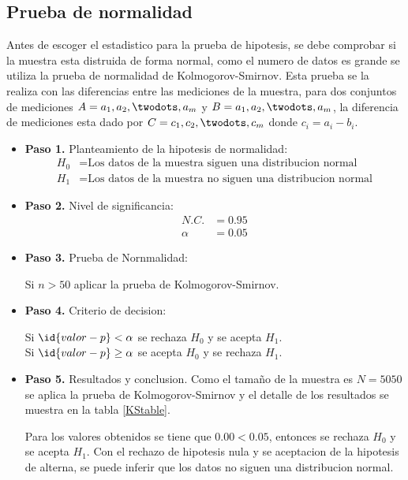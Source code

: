 \subsection{Prueba de normalidad}
Antes de escoger el estadistico para la prueba de hipotesis, se debe comprobar si la muestra esta distruida de forma normal, como el numero de datos es grande se utiliza la prueba de normalidad de Kolmogorov-Smirnov. Esta prueba se la realiza con las diferencias entre las mediciones de la muestra, para dos conjuntos de mediciones $A={a_1,a_2,\twodots,a_m}$ y $B={a_1,a_2,\twodots,a_m}$, la diferencia de mediciones esta dado por $C={c_1,c_2,\twodots,c_m}$ donde $c_i = a_i - b_i$.
\begin{itemize}
  \item[] \textbf{Paso 1.} Planteamiento de la hipotesis de normalidad:
  \begin{equation*}
  \begin{split}
  H_0 & = \text{Los datos de la muestra siguen una distribucion normal}\\
  H_1 & = \text{Los datos de la muestra no siguen una distribucion normal}
  \end{split}
  \end{equation*}
  \item[] \textbf{Paso 2.} Nivel de significancia:
  \begin{equation*}
  \begin{split}
  N.C. & = 0.95 \\
  \alpha & = 0.05
  \end{split}
  \end{equation*}
  \item[] \textbf{Paso 3.} Prueba de Nornmalidad:
  \begin{center}
  Si $n > 50$ aplicar la prueba de Kolmogorov-Smirnov.
  \end{center}
  \item[] \textbf{Paso 4.} Criterio de decision:
  \begin{center}
  Si $\id{valor-p} < \alpha$ se rechaza $H_0$ y se acepta $H_1$.\\
  Si $\id{valor-p} \geq \alpha$ se acepta $H_0$ y se rechaza $H_1$.
  \end{center}
  \item[] \textbf{Paso 5.} Resultados y conclusion.
  Como el tamaño de la muestra es $N=5050$ se aplica la prueba de Kolmogorov-Smirnov y el detalle de los resultados se muestra en la tabla \ref{KStable}.
  
  Para los valores obtenidos se tiene que $0.00 < 0.05$, entonces se rechaza $H_0$ y se acepta $H_1$. Con el rechazo de hipotesis nula y se aceptacion de la hipotesis de alterna, se puede inferir que los datos no siguen una distribucion normal.
\end{itemize}

